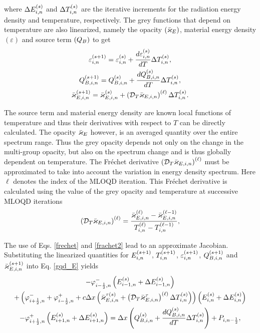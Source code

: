 	where $\Delta E_{i,n}^{\left( s\right)}$ and $\Delta T_{i,n}^{\left( s\right)}$ are the iterative increments for the radiation energy density and temperature, respectively. The grey functions that depend on temperature are also linearized, namely the opacity $(\bar{\varkappa}_{E})$, material energy density $(\varepsilon)$ and source term $(Q_{B})$ to get
	\begin{gather}
		\varepsilon_{i,n}^{\left( s+1\right)} = \varepsilon_{i,n}^{\left( s\right)} + \frac{d\varepsilon_{i,n}^{\left( s\right)}}{dT}\Delta T_{i,n}^{\left( s\right)},\\
		Q_{B,i,n}^{\left( s+1\right)} = Q_{B,i,n}^{\left( s\right)} + \frac{dQ_{B,i,n}^{\left( s\right)}}{dT}\Delta T_{i,n}^{\left( s\right)}, \\
		\bar{\varkappa}_{E,i,n}^{\left( s+1\right)} = \bar{\varkappa}_{E,i,n}^{\left( s\right)} + \left(\mathcal{D}_T \bar{\varkappa}_{E,i,n}\right)^{\left(\ell\right)}\Delta T_{i,n}^{\left( s\right)}. \label{frechet}
	\end{gather}
	
	The source term and material energy density are known local functions of temperature and thus their derivatives with respect to $T$ can be directly calculated. The opacity $\bar{\varkappa}_{E}$ however, is an averaged quantity over the entire spectrum range. Thus the grey opacity depends not only on the change in the multi-group opacity, but also on the spectrum change and is thus globally dependent on temperature. The Fr\'echet derivative $\left(\mathcal{D}_T \bar{\varkappa}_{E,i,n}\right)^{\left(\ell\right)}$ must be approximated to take into account the variation in energy density spectrum. Here $\ell$ denotes the index of the MLOQD iteration. This Fr\'echet derivative is calculated using the value of the grey opacity and temperature at successive MLOQD iterations
	\begin{equation}
		\left(\mathcal{D}_T \bar{\varkappa}_{E,i,n}\right)^{\left(\ell\right)} = \frac{\bar{\varkappa}_{E,i,n}^{\left(\ell\right)} - \bar{\varkappa}_{E,i,n}^{\left(\ell-1\right)}}{T_{i,n}^{\left(\ell\right)} - T_{i,n}^{\left(\ell-1\right)}}, \label{frachet2}
	\end{equation}
	
	The use of Eqs. \eqref{frechet} and \eqref{frachet2} lead to an approximate Jacobian. Substituting the linearized quantities for $E_{i,n}^{\left( s+1\right)}$, $T_{i,n}^{\left( s+1\right)}$, $\varepsilon_{i,n}^{\left( s+1\right)}$, $Q_{B,i,n}^{\left( s+1\right)}$ and $\bar{\varkappa}_{E,i,n}^{\left( s+1\right)}$ into Eq. \eqref{gqd_E} yields
	\begin{multline}
		 - \varphi_{i-\frac{1}{2},n}^{-}\left(E_{i-1,n}^{\left( s\right)} + \Delta E_{i-1,n}^{\left( s\right)}\right) \\+ \left(\varphi_{i+\frac{1}{2},n}^{-} + \varphi_{i-\frac{1}{2},n}^{+} + c\Delta x\left(\bar{\varkappa}_{E,i,n}^{\tau\left( s\right)} + \left(\mathcal{D}_T \bar{\varkappa}_{E,i,n}^{\tau}\right)^{\left(\ell\right)}\Delta T_{i,n}^{\left( s\right)}\right)\right)\left(E_{i,n}^{\left( s\right)} + \Delta E_{i,n}^{\left( s\right)}\right) \\- \varphi_{i+\frac{1}{2},n}^{+}\left(E_{i+1,n}^{\left( s\right)} + \Delta E_{i+1,n}^{\left( s\right)}\right)= \Delta x\left(Q_{B,i,n}^{\left( s\right)} + \frac{dQ_{B,i,n}^{\left( s\right)}}{dT}\Delta T_{i,n}^{\left( s\right)}\right) + P_{i,n-\frac{1}{2}},
	\end{multline}
	
